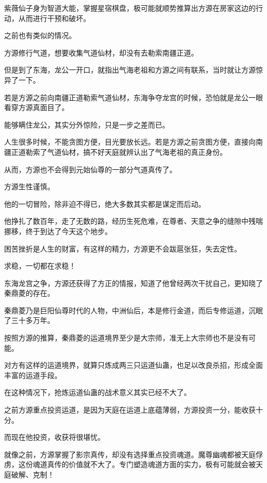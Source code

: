 
\begin{this_body}

紫薇仙子身为智道大能，掌握星宿棋盘，极可能就顺势推算出方源在房家这边的行动，从而进行干预和破坏。

之前也有类似的情况。

方源修行气道，想要收集气道仙材，却没有去勒索南疆正道。

但是到了东海，龙公一开口，就指出气海老祖和方源之间有联系，当时就让方源惊异了一下。

若是方源之前向南疆正道勒索气道仙材，东海争夺龙宫的时候，恐怕就是龙公一眼看穿方源真面目了。

能够瞒住龙公，其实分外惊险，只是一步之差而已。

人生很多时候，不能贪图方便，目光要放长远。若是方源之前贪图方便，直接向南疆正道勒索了气道仙材，搞不好天庭就辨认出了气海老祖的真正身份。

从而，方源也不会得到元始仙尊的一部分气道真传了。

方源生性谨慎。

他的一切冒险，除非迫不得已，绝大多数其实都是谋定而后动。

他挣扎了数百年，走了无数的路，经历生死危难，在尊者、天意之争的缝隙中残喘挪移，终于到达了今天这个地步。

困苦挫折是人生的财富，有这样的精力，方源更不会跋扈张狂，失去定性。

求稳，一切都在求稳！

东海龙宫之争，方源还获得了方正的情报，知道了他曾经两次干扰自己，更知晓了秦鼎菱的存在。

秦鼎菱乃是巨阳仙尊时代的人物，中洲仙后，本是修行金道，而后专修运道，沉眠了三十多万年。

按照方源的推算，秦鼎菱的运道境界至少是大宗师，准无上大宗师也不是没有可能。

对方有这样的运道境界，就算只炼成两三只运道仙蛊，也足以改良杀招，形成全面丰富的运道手段。

在这种情况下，抢炼运道仙蛊的战术意义其实已经不大了。

之前方源重点投资运道，是因为天庭在运道上底蕴薄弱，方源投资一分，能收获十分。

而现在他投资，收获将很堪忧。

就像之前，方源掌握了影宗真传，却没有选择重点投资魂道。魔尊幽魂都被天庭俘虏，这份魂道真传的价值就不大了。专门塑造魂道方面的实力，极有可能就会被天庭破解、克制！


\end{this_body}

